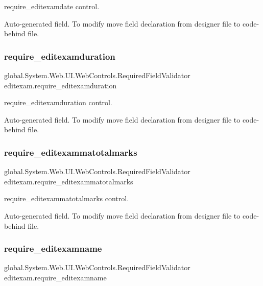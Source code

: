 require\+\_\+editexamdate control. 

Auto-\/generated field. To modify move field declaration from designer file to code-\/behind file. \mbox{\label{classeditexam_abc133b98e41b6abfd8a863129aca0ce5}} 
\subsubsection{\texorpdfstring{require\_editexamduration}{require\_editexamduration}}
{\footnotesize\ttfamily global.\+System.\+Web.\+U\+I.\+Web\+Controls.\+Required\+Field\+Validator editexam.\+require\+\_\+editexamduration\hspace{0.3cm}{\ttfamily [protected]}}



require\+\_\+editexamduration control. 

Auto-\/generated field. To modify move field declaration from designer file to code-\/behind file. \mbox{\label{classeditexam_a1874b2a8ceabb8cb0e3975addf64c735}} 
\subsubsection{\texorpdfstring{require\_editexammatotalmarks}{require\_editexammatotalmarks}}
{\footnotesize\ttfamily global.\+System.\+Web.\+U\+I.\+Web\+Controls.\+Required\+Field\+Validator editexam.\+require\+\_\+editexammatotalmarks\hspace{0.3cm}{\ttfamily [protected]}}



require\+\_\+editexammatotalmarks control. 

Auto-\/generated field. To modify move field declaration from designer file to code-\/behind file. \mbox{\label{classeditexam_ae16c183b6fd56d9c7a91d3fcd4fb8c51}} 
\subsubsection{\texorpdfstring{require\_editexamname}{require\_editexamname}}
{\footnotesize\ttfamily global.\+System.\+Web.\+U\+I.\+Web\+Controls.\+Required\+Field\+Validator editexam.\+require\+\_\+editexamname\hspace{0.3cm}{\ttfamily [protected]}}



